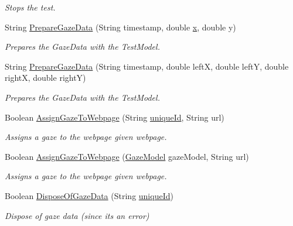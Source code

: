 \begin{DoxyCompactItemize}
\begin{DoxyCompactList}\small\item\em Stops the test. \end{DoxyCompactList}\item 
String \hyperlink{class_web_analyzer_1_1_controller_1_1_test_controller_af621c99b82c5589e2fa446fad6c0839e}{Prepare\+Gaze\+Data} (String timestamp, double \hyperlink{_u_i_2_h_t_m_l_resources_2js_2lib_2underscore_8min_8js_a81e910173af87b1161e719a504d52407}{x}, double y)
\begin{DoxyCompactList}\small\item\em Prepares the Gaze\+Data with the Test\+Model. \end{DoxyCompactList}\item 
String \hyperlink{class_web_analyzer_1_1_controller_1_1_test_controller_accf7fa7b749594a749875738800679b9}{Prepare\+Gaze\+Data} (String timestamp, double left\+X, double left\+Y, double right\+X, double right\+Y)
\begin{DoxyCompactList}\small\item\em Prepares the Gaze\+Data with the Test\+Model. \end{DoxyCompactList}\item 
Boolean \hyperlink{class_web_analyzer_1_1_controller_1_1_test_controller_a576aa4ab5c0fc2d7a10bcdbf2daaf1ef}{Assign\+Gaze\+To\+Webpage} (String \hyperlink{_u_i_2_h_t_m_l_resources_2js_2lib_2underscore_8min_8js_af690ff5521d79c7128861033ae80ae17}{unique\+Id}, String url)
\begin{DoxyCompactList}\small\item\em Assigns a gaze to the webpage given webpage. \end{DoxyCompactList}\item 
Boolean \hyperlink{class_web_analyzer_1_1_controller_1_1_test_controller_aeffea7da4e0bf3400ebddc5440dc2def}{Assign\+Gaze\+To\+Webpage} (\hyperlink{class_web_analyzer_1_1_models_1_1_data_model_1_1_gaze_model}{Gaze\+Model} gaze\+Model, String url)
\begin{DoxyCompactList}\small\item\em Assigns a gaze to the webpage given webpage. \end{DoxyCompactList}\item 
Boolean \hyperlink{class_web_analyzer_1_1_controller_1_1_test_controller_ae88c0e776f3d18dc0c0cfc2106b2f1a5}{Dispose\+Of\+Gaze\+Data} (String \hyperlink{_u_i_2_h_t_m_l_resources_2js_2lib_2underscore_8min_8js_af690ff5521d79c7128861033ae80ae17}{unique\+Id})
\begin{DoxyCompactList}\small\item\em Dispose of gaze data (since its an error) \end{DoxyCompactList}\item 

\end{DoxyCompactItemize}
